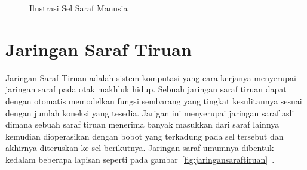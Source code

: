 \begin{figure}[htbp]
    \begin{center}
    \end{center}
    \vspace{-20pt}
    \captionsetup{labelfont=bf, textfont=bf}
    \caption{Ilustrasi Sel Saraf Manusia}
    \vspace{-10pt}
    \captionsetup{labelfont=md, textfont=md}
    \label{fig:selsaraf}
\end{figure}

\section{Jaringan Saraf Tiruan}
\label{sec:2-JaringanSarafTiruan}

Jaringan Saraf Tiruan adalah sistem komputasi yang cara kerjanya menyerupai jaringan saraf pada otak
makhluk hidup. Sebuah jaringan saraf tiruan dapat dengan otomatis
memodelkan fungsi sembarang yang tingkat kesulitannya sesuai dengan jumlah koneksi yang tesedia.
Jarigan ini menyerupai jaringan saraf asli dimana
sebuah saraf tiruan menerima banyak masukkan dari saraf lainnya
kemudian dioperasikan dengan bobot yang terkadung pada sel tersebut dan akhirnya diteruskan ke sel
berikutnya. Jaringan saraf umumnya dibentuk kedalam beberapa lapisan seperti pada
gambar~\ref{fig:jaringansaraftiruan}~\cite{croann}.

